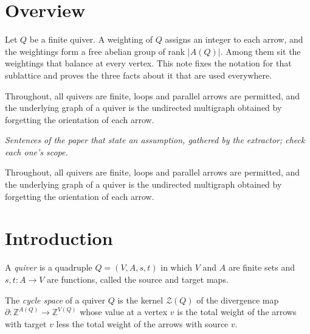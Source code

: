 
\section*{Overview}
Let $Q$ be a finite quiver. A weighting of $Q$ assigns an integer to each arrow, and the weightings form a free abelian group of rank $|A(Q)|$. Among them sit the weightings that balance at every vertex. This note fixes the notation for that sublattice and proves the three facts about it that are used everywhere.

Throughout, all quivers are finite, loops and parallel arrows are permitted, and the underlying graph of a quiver is the undirected multigraph obtained by forgetting the orientation of each arrow.

\begin{theorem}\label{Arden24v2-setup}
\emph{Sentences of the paper that state an assumption, gathered by the extractor; check each one's scope.}

Throughout, all quivers are finite, loops and parallel arrows are permitted, and the underlying graph of a quiver is the undirected multigraph obtained by forgetting the orientation of each arrow.
\end{theorem}

\section{Introduction}\label{Arden24v2-sec-1}

\begin{definition}\label{Arden24v2-def-1.1}
\label{Arden24v2-def:quiver}
A \emph{quiver} is a quadruple $Q = (V, A, s, t)$ in which $V$ and $A$ are finite sets and $s, t \colon A \to V$ are functions, called the source and target maps.
\end{definition}

\begin{definition}\label{Arden24v2-def-1.2}
\label{Arden24v2-def:cycle-space}
The \emph{cycle space} of a quiver $Q$ is the kernel $\mathcal{Z}(Q)$ of the divergence map $\partial \colon \mathbb{Z}^{A(Q)} \to \mathbb{Z}^{V(Q)}$ whose value at a vertex $v$ is the total weight of the arrows with target $v$ less the total weight of the arrows with source $v$.
\end{definition}

